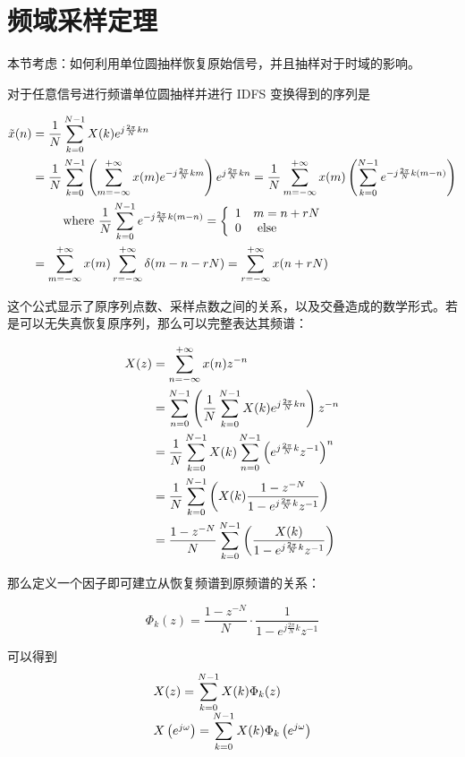 \documentclass[cn,11pt,chinese,black,simple]{elegantbook}
\begin{document}
\section{频域采样定理}

本节考虑：如何利用单位圆抽样恢复原始信号，并且抽样对于时域的影响。

对于任意信号进行频谱单位圆抽样并进行 IDFS 变换得到的序列是 

\[
\begin{aligned}
\tilde{x}(n)&=\frac{1}{N} \displaystyle\sum_{k=0}^{N-1} X(k) e^{j \frac{2 \pi}{N} k n}\\
&=\frac{1}{N} \displaystyle\sum_{k=0}^{N-1}\left(\displaystyle\sum_{m=-\infty}^{+\infty} x(m) e^{-j \frac{2 \pi}{N} k m}\right) e^{j \frac{2 \pi}{N} k n}=\frac{1}{N} \displaystyle\sum_{m=-\infty}^{+\infty} x(m)\left(\displaystyle\sum_{k=0}^{N-1} e^{-j \frac{2 \pi}{N} k(m-n)}\right)\\
&\;\;\;\;\;\;\;\;\text{ where }\frac{1}{N} \displaystyle\sum_{k=0}^{N-1} e^{-j \frac{2 \pi}{N} k(m-n)}=\left\{\begin{array}{ll}
1 & m=n+r N \\
0 & \text { else }
\end{array}\right.\\
&=\displaystyle\sum_{m=-\infty}^{+\infty} x(m) \displaystyle\sum_{r=-\infty}^{+\infty} \delta(m-n-r N)=\displaystyle\sum_{r=-\infty}^{+\infty} x(n+r N)
\end{aligned}
\]

这个公式显示了原序列点数、采样点数之间的关系，以及交叠造成的数学形式。若是可以无失真恢复原序列，那么可以完整表达其频谱：

\[
\begin{aligned}
X(z) &=\displaystyle\sum_{n=-\infty}^{+\infty} x(n) z^{-n} \\
&=\displaystyle\sum_{n=0}^{N-1}\left(\frac{1}{N} \displaystyle\sum_{k=0}^{N-1} X(k) e^{j \frac{2 \pi}{N} k n}\right) z^{-n} \\
&=\frac{1}{N} \displaystyle\sum_{k=0}^{N-1} X(k) \displaystyle\sum_{n=0}^{N-1}\left(e^{j \frac{2 \pi}{N} k} z^{-1}\right)^{n} \\ 
&=\frac{1}{N} \displaystyle\sum_{k=0}^{N-1}\left(X(k) \frac{1-z^{-N}}{1-e^{j \frac{2 \pi}{N} k} z^{-1}}\right) \\
&=\frac{1-z^{-N}}{N} \displaystyle\sum_{k=0}^{N-1}\left(\frac{X(k)}{1-e^{j \frac{2 \pi}{N} k} z^{-1}}\right)
\end{aligned}
\]

那么定义一个因子即可建立从恢复频谱到原频谱的关系：

\[\Phi_k(z) = \frac{1-z^{-N}}{N} \cdot \frac{1}{1-e^{j\frac{2\pi}{N} k }z^{-1}} \] 

可以得到 \[
    \begin{array}{l}
    X(z)=\displaystyle\sum_{k=0}^{N-1} X(k) \Phi_{k}(z) \\
    X\left(e^{j \omega}\right)=\displaystyle\sum_{k=0}^{N-1} X(k) \Phi_{k}\left(e^{j \omega}\right)
    \end{array}
    \]
\end{document}
